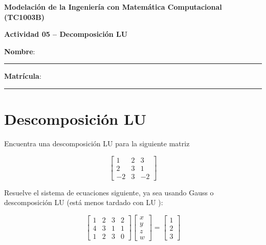 \documentclass[spanish, 10pt]{article}
\begin{document}
\begin{center}
	{\Large \textbf{Modelación de la Ingeniería con Matemática Computacional (TC1003B)}}
	
	\bigskip
	{\large \textbf{Actividad 05 -- Decomposición LU}}
\end{center}

\bigskip
{\large \textbf{Nombre}: \rule{13.7 cm}{0.4mm}}



\bigskip
{\large \textbf{Matrícula}: \rule{5 cm}{0.4mm}} %

\bigskip


\section*{Descomposición LU}

Encuentra una descomposición LU para la siguiente matriz

\bigskip

$$
\begin{bmatrix}
    1 & 2 & 3 \\
    2 & 3 & 1 \\
    -2 & 3 & -2
\end{bmatrix}
$$

\vspace{25ex}

Resuelve el sistema de ecuaciones siguiente, ya sea usando Gauss o descomposición LU (está menos tardado con LU ):

$$\begin{bmatrix}
    1 & 2 & 3 & 2 \\
    4 & 3 & 1 & 1 \\
    1 & 2 & 3 & 0
\end{bmatrix}
\begin{bmatrix}
    x \\ y \\ z \\ w
\end{bmatrix}
=
\begin{bmatrix}
    1 \\ 2 \\ 3
\end{bmatrix}
$$
\end{document}
